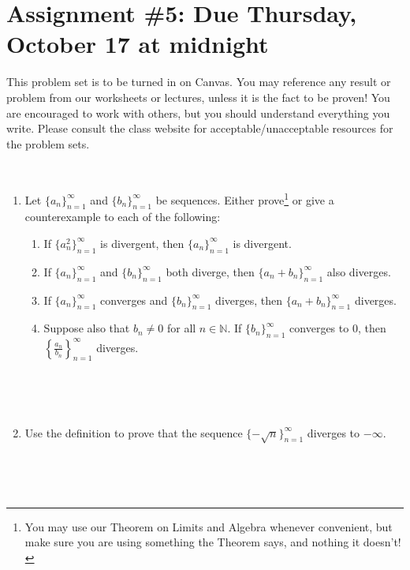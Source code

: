\documentclass[12pt]{amsart}
\newcommand{\N}{\mathbb{N}}
\newcommand{\showsol}[1]{\def\displaysol{#1}}
\begin{document}
\showsol{1}
	
	\thispagestyle{empty}
	
	\section*{Assignment \#5: Due Thursday, October 17 at midnight}
	
	This problem set is to be turned in on Canvas. You may reference any result or problem from our worksheets or lectures, unless it is the fact to be proven! You are encouraged to work with others, but you should understand everything you write. Please consult the class website for acceptable/unacceptable resources for the problem sets.
	
	\
	
	

\begin{enumerate}

\item Let $\{a_n\}_{n=1}^\infty$ and $\{b_n\}_{n=1}^\infty$ be sequences. Either prove\footnote{You may use our Theorem on Limits and Algebra whenever convenient, but make sure you are using something the Theorem says, and nothing it doesn't!} or give a counterexample to each of the following:
\begin{enumerate}
\item If $\{a_n^2\}_{n=1}^\infty$ is divergent, then $\{a_n\}_{n=1}^\infty$ is divergent.
\item If $\{a_n\}_{n=1}^\infty$ and $\{b_n\}_{n=1}^\infty$ both diverge, then $\{a_n + b_n\}_{n=1}^\infty$ also diverges.
\item If $\{a_n\}_{n=1}^\infty$ converges and $\{b_n\}_{n=1}^\infty$ diverges, then $\{a_n + b_n\}_{n=1}^\infty$ diverges.
\item Suppose also that $b_n\neq 0$ for all $n\in \N$. If $\{b_n\}_{n=1}^\infty$ converges to $0$, then $\displaystyle \left\{\frac{a_n}{b_n}\right\}_{n=1}^\infty$ diverges.
\end{enumerate}

\

\


\item Use the definition to prove that the sequence $\{ -\sqrt{n} \}_{n=1}^\infty$ diverges to $-\infty$.


\

\






\end{enumerate}
\end{document}
